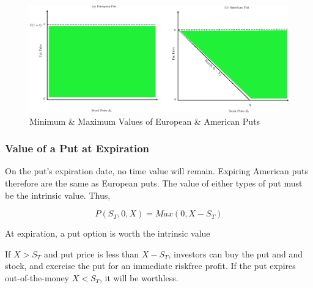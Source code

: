 \documentclass{book}
\theoremstyle{definition}
\theoremstyle{remark}
\begin{document}
                \begin{figure}[h]
                    \centering
                        \includegraphics[scale=0.45]{images/fig:PutMinMax.eps}
                    \caption{Minimum \& Maximum Values of European \& American Puts}
                    \label{fig:PutMinMax}                
                \end{figure}            
                
        \subsubsection{Value of a Put at Expiration}
            On the put's expiration date, no time value will remain. Expiring American puts therefore are the same as European puts. The value of either types of put must be the intrinsic value. Thus,
            
                \begin{equation}
                    P(S_T, 0, X) = Max(0, X - S_T)
                \end{equation}
                
        \begin{tcolorbox}[colback=blue!5!white,colframe=blue!75!black, title=Sticky Note]
            At expiration, a put option is worth the intrinsic value 
        \end{tcolorbox}               
            
            If $X > S_T$ and put price is less than $X - S_T$, investors can buy the put and and stock, and exercise the put for an immediate riskfree profit. If the put expires out-of-the-money $X < S_T$, it will be worthless. 
\end{document}
